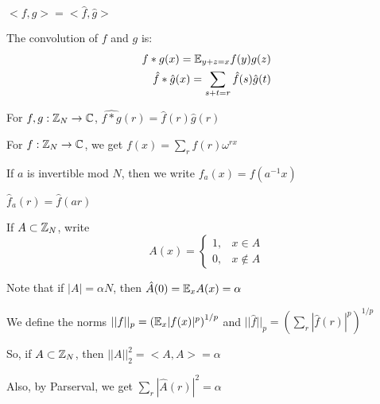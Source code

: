 \documentclass[a4paper]{article}
\begin{document}
{\begin{fact}
	$<f,g> = <\hat{f},\hat{g}>$
\end{fact}

\begin{defi}[Convolution]
	The convolution of $f$ and $g$ is:
	\begin{align*}
		f*g(x) = \mathbb{E}_{y+z=x}f(y)g(z)\\
		\hat{f}*\hat{g}(x) = \sum_{s+t=r}\hat{f}(s)\hat{g}(t)
	\end{align*}
\end{defi}

\begin{fact}
	For $f,g:\mathbb{Z}_N \rightarrow \mathbb{C}$, $\hat{f*g}(r) = \hat{f}(r)\hat{g}(r)$
\end{fact}

\begin{fact}
	For $f:\mathbb{Z}_N \rightarrow \mathbb{C}$, we get $f(x)=\sum_{r}\hat{f}(r)\omega^{rx}$
\end{fact}


\begin{defi}
	If $a$ is invertible mod $N$, then we write $f_a(x) = f(a^{-1}x)$
\end{defi}

\begin{fact}
	$\hat{f}_a(r) = \hat{f}(ar)$
\end{fact}

\begin{defi}[Indicators]
	If $A\subset\mathbb{Z}_N$, write 
	\[
	A(x)=
	\begin{cases}
		1, &x\in A\\
		0, &x\notin A
	\end{cases}
	\]
\end{defi}

Note that if $|A|=\alpha N$, then $\hat{A}(0)=\mathbb{E}_xA(x)=\alpha$

\begin{defi}[Norms]
	We define the norms $||f||_p = \left(\mathbb{E}_x|f(x)|^p\right)^{1/p}$ and $||\hat{f}||_p = \left(\sum_r|\hat{f}(r)|^p\right)^{1/p}$
\end{defi}

So, if $A\subset\mathbb{Z}_N$, then $||A||_2^2=<A,A>=\alpha$

Also, by Parserval, we get $\sum_r\left|\hat{A}(r)\right|^2=\alpha$


}
\end{document}

